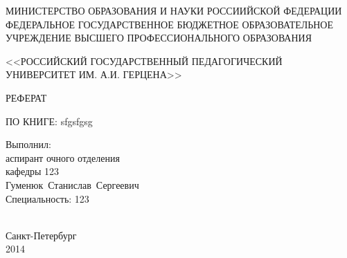 \thispagestyle{empty}

\begin{center}
МИНИСТЕРСТВО ОБРАЗОВАНИЯ И НАУКИ РОССИИЙСКОЙ ФЕДЕРАЦИИ\\
ФЕДЕРАЛЬНОЕ ГОСУДАРСТВЕННОЕ БЮДЖЕТНОЕ ОБРАЗОВАТЕЛЬНОЕ\\
УЧРЕЖДЕНИЕ ВЫСШЕГО ПРОФЕССИОНАЛЬНОГО ОБРАЗОВАНИЯ\par 

<<РОССИЙСКИЙ ГОСУДАРСТВЕННЫЙ ПЕДАГОГИЧЕСКИЙ\\
УНИВЕРСИТЕТ ИМ. А.И. ГЕРЦЕНА>>
\par
\end{center}



\vspace{50mm}

\begin{center}
РЕФЕРАТ 

ПО КНИГЕ: sfgsfgsg



\end{center}

\vspace{20mm}
\begin{flushright}
\begin{minipage}
{0.4\textwidth} 
Выполнил:\\
аспирант очного отделения\\
кафедры 123\\
Гуменюк~Станислав~Сергеевич\\ 
Специальность: 123\\
\\[0.3cm] 
\end{minipage}

\end{flushright}

\vfill
\begin{center}
{Санкт-Петербург \\ 2014}
\end{center}

\newpage
